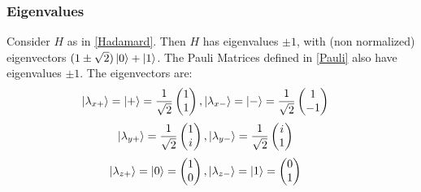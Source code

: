 \documentclass{beamer}
\begin{document}
    \begin{frame}
        \frametitle{Eigenvalues}
        \begin{example}
            Consider $H$ as in \ref{Hadamard}. Then $H$ has eigenvalues $\pm 1$, with (non normalized) eigenvectors $(1 \pm \sqrt{2})\ket{0} + \ket{1}$.
            The Pauli Matrices defined in \ref{Pauli} also have eigenvalues $\pm 1$. The eigenvectors are:
            \begin{align}
                \label{decomposition}
                \ket{\lambda_{x+}} = \ket{+} &= \frac{1}{\sqrt{2}} \begin{pmatrix}
                    1 \\
                    1
                \end{pmatrix},
                \ket{\lambda_{x-}} = \ket{-} = \frac{1}{\sqrt{2}} \begin{pmatrix}
                    1 \\
                    -1
                \end{pmatrix}
            \end{align}
            \begin{align}
                \ket{\lambda_{y+}} &= \frac{1}{\sqrt{2}} \begin{pmatrix}
                    1 \\
                    i
                \end{pmatrix},
                \ket{\lambda_{y-}} = \frac{1}{\sqrt{2}} \begin{pmatrix}
                    i \\
                    1
                \end{pmatrix}
            \end{align}
            \begin{align}
                \ket{\lambda_{z+}} &= \ket{0} = \begin{pmatrix}
                    1 \\
                    0
                \end{pmatrix},
                \ket{\lambda_{z-}} = \ket{1} = \begin{pmatrix}
                    0 \\
                    1
                \end{pmatrix}
            \end{align}
        \end{example}
    \end{frame}
\end{document}
